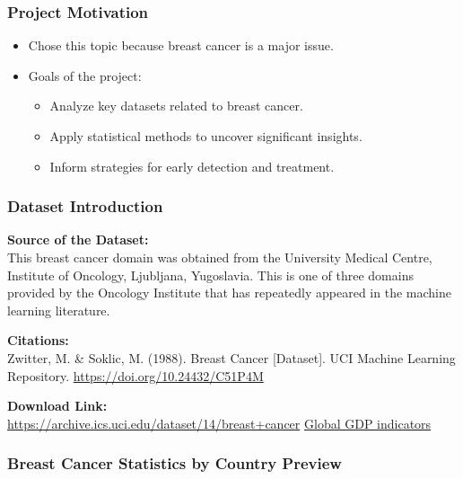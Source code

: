 
\begin{frame}
    \titlepage
\end{frame}

\begin{frame}
    \frametitle{Project Motivation}
    {\LARGE
        \begin{itemize}
            \item Chose this topic because breast cancer is a major issue.
            \item Goals of the project:
                  \begin{itemize}
                      \item Analyze key datasets related to breast cancer.
                      \item Apply statistical methods to uncover significant insights.
                      \item Inform strategies for early detection and treatment.
                  \end{itemize}
        \end{itemize}
    }
\end{frame}

\begin{frame}
    \frametitle{Dataset Introduction}
    \textbf{Source of the Dataset:}\\[1ex]
    This breast cancer domain was obtained from the University Medical Centre, Institute of Oncology, Ljubljana, Yugoslavia. This is one of three domains provided by the Oncology Institute that has repeatedly appeared in the machine learning literature.
    
    \vspace{1em}
    \textbf{Citations:}\\[0.5ex]
    Zwitter, M. \& Soklic, M. (1988). Breast Cancer [Dataset]. UCI Machine Learning Repository. \href{https://doi.org/10.24432/C51P4M}{https://doi.org/10.24432/C51P4M}
    
    \vspace{1em}
    \textbf{Download Link:}\\[0.5ex]
    \href{https://archive.ics.uci.edu/dataset/14/breast+cancer}{https://archive.ics.uci.edu/dataset/14/breast+cancer}
    \href{https://data.worldbank.org/indicator/NY.GDP.MKTP.CD}{Global GDP indicators}
\end{frame}


\begin{frame}
    \frametitle{Breast Cancer Statistics by Country Preview}
    
    \vspace{1em}
    
\end{frame}

